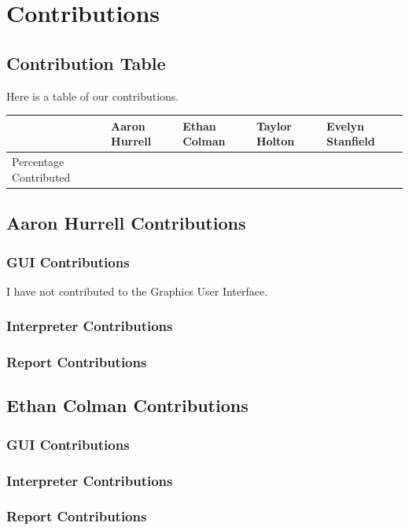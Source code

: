 \documentclass[a4paper, oneside, 11pt]{report}
\begin{document}
	\appendix
	\chapter{Contributions}
	\section{Contribution Table}
	Here is a table of our contributions. \\

	\begin{table}[h]
		\begin{tabular}{|l|l|l|l|l|}
			\hline
			& Aaron Hurrell & Ethan Colman & Taylor Holton & Evelyn Stanfield \\ \hline
			Percentage Contributed &               &              &               &                  \\ \hline
		\end{tabular}
	\end{table}

	\section{Aaron Hurrell Contributions}
	\subsection{GUI Contributions}
	I have not contributed to the Graphics User Interface.
	\subsection{Interpreter Contributions}
	\subsection{Report Contributions}

	\section{Ethan Colman Contributions}
	\subsection{GUI Contributions}
	\subsection{Interpreter Contributions}
	\subsection{Report Contributions}
\end{document}
